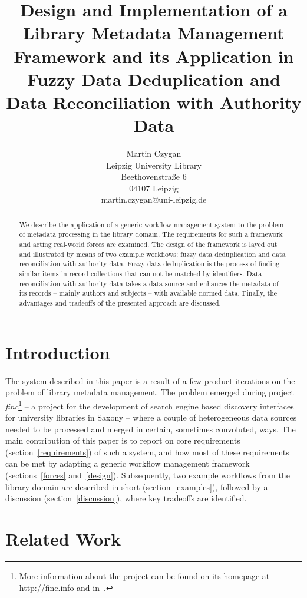 \documentclass[english]{lni}
\author{
Martin Czygan \\
Leipzig University Library \\
Beethovenstra\ss{}e 6 \\
04107 Leipzig \\
martin.czygan@uni-leipzig.de
}
\title{Design and Implementation of a Library Metadata Management Framework and its Application
in Fuzzy Data Deduplication and Data Reconciliation with Authority Data}
\begin{document}
\maketitle

\begin{abstract}
We describe the application of a generic workflow management
system to the problem of metadata processing in the library domain. The
requirements for such a framework and acting real-world forces
are examined. The design of the framework is layed out and illustrated by means of two example workflows: fuzzy data deduplication and data reconciliation
with authority data. Fuzzy data deduplication is the process of finding
similar items in record collections that can not be matched by identifiers. Data reconciliation with authority
data takes a data source and enhances the metadata of its records -- mainly authors and subjects -- with available
normed data. Finally, the advantages and tradeoffs of the presented approach are discussed.

\end{abstract}

\section{Introduction}

The system described in this paper is a result of a few
product iterations on the problem of library metadata management. The problem
emerged during project \emph{finc}\footnote{More information about the project can
be found on its homepage at \url{http://finc.info} and in~\cite{GBV0007757838}.} -- a project for the development of search engine based discovery interfaces for university libraries in Saxony -- where a couple of heterogeneous data sources needed to be processed and merged in certain, sometimes convoluted, ways. The main contribution of this paper is to report on core requirements (section~\ref{requirements}) of such a system, and how most of these requirements can be met by adapting a generic workflow management framework (sections~\ref{forces} and~\ref{design}). Subsequently, two example workflows from the library domain are described in short (section~\ref{examples}), followed by a discussion (section~\ref{discussion}), where key tradeoffs are identified.

\section{Related Work}
\end{document}
